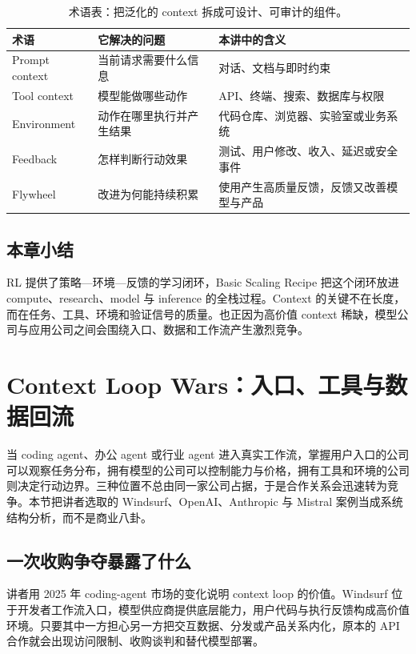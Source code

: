 \documentclass[a4paper]{article}
\begin{document}
\begin{table}[H]
\centering
\begin{tabular}{L{0.18\textwidth}L{0.32\textwidth}L{0.4\textwidth}}
\toprule
术语 & 它解决的问题 & 本讲中的含义 \\
\midrule
Prompt context & 当前请求需要什么信息 & 对话、文档与即时约束 \\
Tool context & 模型能做哪些动作 & API、终端、搜索、数据库与权限 \\
Environment & 动作在哪里执行并产生结果 & 代码仓库、浏览器、实验室或业务系统 \\
Feedback & 怎样判断行动效果 & 测试、用户修改、收入、延迟或安全事件 \\
Flywheel & 改进为何能持续积累 & 使用产生高质量反馈，反馈又改善模型与产品 \\
\bottomrule
\end{tabular}
\caption{术语表：把泛化的 context 拆成可设计、可审计的组件。}
\end{table}

\subsection{本章小结}

RL 提供了策略—环境—反馈的学习闭环，Basic Scaling Recipe 把这个闭环放进 compute、research、model 与 inference 的全栈过程。Context 的关键不在长度，而在任务、工具、环境和验证信号的质量。也正因为高价值 context 稀缺，模型公司与应用公司之间会围绕入口、数据和工作流产生激烈竞争。

\section{Context Loop Wars：入口、工具与数据回流}

当 coding agent、办公 agent 或行业 agent 进入真实工作流，掌握用户入口的公司可以观察任务分布，拥有模型的公司可以控制能力与价格，拥有工具和环境的公司则决定行动边界。三种位置不总由同一家公司占据，于是合作关系会迅速转为竞争。本节把讲者选取的 Windsurf、OpenAI、Anthropic 与 Mistral 案例当成系统结构分析，而不是商业八卦。

\subsection{一次收购争夺暴露了什么}

讲者用 2025 年 coding-agent 市场的变化说明 context loop 的价值。Windsurf 位于开发者工作流入口，模型供应商提供底层能力，用户代码与执行反馈构成高价值环境。只要其中一方担心另一方把交互数据、分发或产品关系内化，原本的 API 合作就会出现访问限制、收购谈判和替代模型部署。
\end{document}
